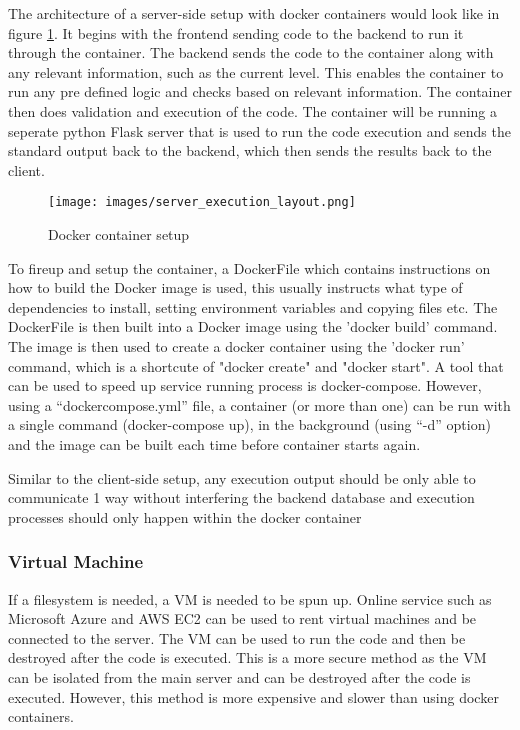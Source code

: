 The architecture of a server-side setup with docker containers would look like in figure \ref{fig:docker container setup}. It begins with the frontend sending code to the backend to run it through the container. The backend sends the code to the container along with any relevant information, such as the current level. This enables the container to run any pre defined logic and checks based on relevant information. The container then does validation and execution of the code. The container will be running a seperate python Flask server that is used to run the code execution and sends the standard output back to the backend, which then sends the results back to the client.

\begin{figure}
    \centering
    \texttt{[image: images/server\_execution\_layout.png]}
    \caption{Docker container setup}
    \label{fig:docker container setup}
\end{figure}

To fireup and setup the container, a DockerFile which contains instructions on how to build the Docker image is used, this usually instructs what type of dependencies to install, setting environment variables and copying files etc. The DockerFile is then built into a Docker image using the 'docker build' command. The image is then used to create a docker container using the 'docker run' command, which is a shortcute of "docker create" and "docker start". A tool that can be used to speed up service running process is docker-compose. However, using a “dockercompose.yml” file, a container (or more than one) can be run with a single command (docker-compose up), in the background (using “-d” option) and the image can be built each time before container starts again.

Similar to the client-side setup, any execution output should be only able to communicate 1 way without interfering the backend database and execution processes should only happen within the docker container




\subsubsection{Virtual Machine}
If a filesystem is needed, a VM is needed to be spun up. Online service such as Microsoft Azure and AWS EC2 can be used to rent virtual machines and be connected to the server. The VM can be used to run the code and then be destroyed after the code is executed. This is a more secure method as the VM can be isolated from the main server and can be destroyed after the code is executed. However, this method is more expensive and slower than using docker containers.

